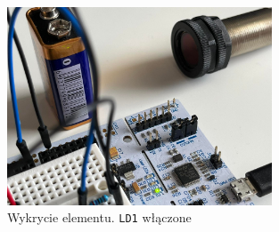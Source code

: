 \documentclass[11pt, a4paper]{article}
\begin{document}
\begin{figure}[h!]
    \centering
    \includegraphics[angle=0, width=0.7\textwidth]{fig/SCOO/mikro-on.jpg}
        \caption{Wykrycie elementu. \texttt{LD1} włączone}
\end{figure}


\newpage
\printbibliography[heading=bibintoc]
\end{document}
